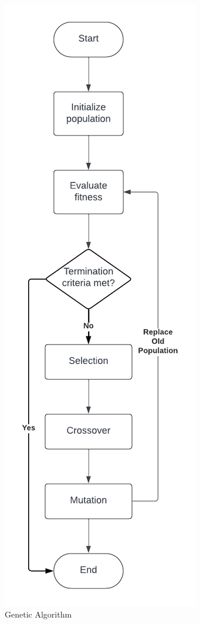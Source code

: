 \begin{appendices}
\begin{centerappendixtitle}
		\begin{figure}[h]
			\centering
			\caption{Genetic Algorithm}
			\label{genalgoFlow}
			\includegraphics[width=\textwidth,height=\textheight,keepaspectratio]{appendix/Genetic Algorithm Flowchart}
		\end{figure}
		

\end{centerappendixtitle}
\end{appendices}
